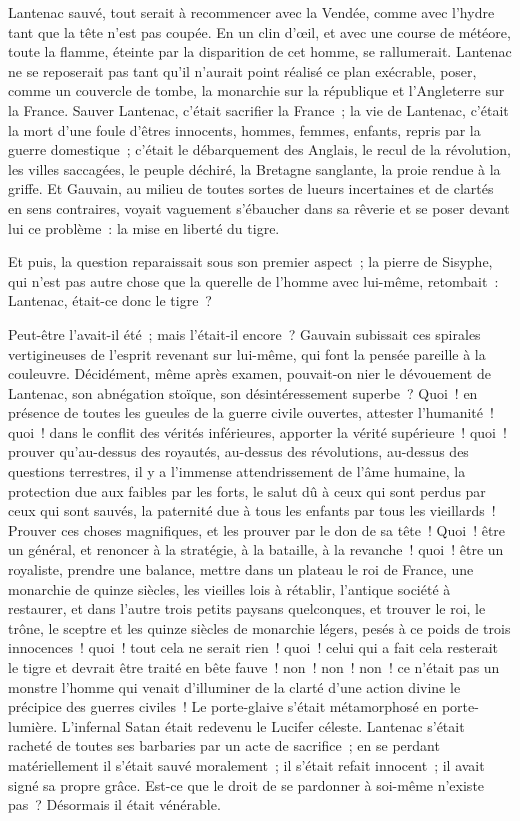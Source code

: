 \documentclass[french,twoside]{book} %
\begin{document}
Lantenac sauvé, tout serait à recommencer avec la Vendée, comme avec l’hydre tant que la tête n’est pas coupée. En un clin d’œil, et avec une course de météore, toute la flamme, éteinte par la disparition de cet homme, se rallumerait. Lantenac ne se reposerait pas tant qu’il n’aurait point réalisé ce plan exécrable, poser, comme un couvercle de tombe, la monarchie sur la république et l’Angleterre sur la France. Sauver Lantenac, c’était sacrifier la France ; la vie de Lantenac, c’était la mort d’une foule d’êtres innocents, hommes, femmes, enfants, repris par la guerre domestique ; c’était le débarquement des Anglais, le recul de la révolution, les villes saccagées, le peuple déchiré, la Bretagne sanglante, la proie rendue à la griffe. Et  Gauvain, au milieu de toutes sortes de lueurs incertaines et de clartés en sens contraires, voyait vaguement s’ébaucher dans sa rêverie et se poser devant lui ce problème : la mise en liberté du tigre.\par
Et puis, la question reparaissait sous son premier aspect ; la pierre de Sisyphe, qui n’est pas autre chose que la querelle de l’homme avec lui-même, retombait : Lantenac, était-ce donc le tigre ?\par
Peut-être l’avait-il été ; mais l’était-il encore ? Gauvain subissait ces spirales vertigineuses de l’esprit revenant sur lui-même, qui font la pensée pareille à la couleuvre. Décidément, même après examen, pouvait-on nier le dévouement de Lantenac, son abnégation stoïque, son désintéressement superbe ? Quoi ! en présence de toutes les gueules de la guerre civile ouvertes, attester l’humanité ! quoi ! dans le conflit des vérités inférieures, apporter la vérité supérieure ! quoi ! prouver qu’au-dessus des royautés, au-dessus des révolutions, au-dessus des questions terrestres, il y a l’immense attendrissement de l’âme humaine, la protection due aux faibles par les forts, le salut dû à ceux qui sont perdus par ceux qui sont sauvés, la paternité due à tous les enfants par tous les vieillards ! Prouver ces choses magnifiques, et les prouver par le don de sa tête ! Quoi ! être un général, et renoncer à la stratégie, à la bataille, à la revanche ! quoi ! être un royaliste, prendre une balance, mettre dans un plateau le roi de France, une monarchie de quinze siècles, les vieilles lois à rétablir, l’antique société à restaurer, et dans l’autre trois petits paysans quelconques,  et trouver le roi, le trône, le sceptre et les quinze siècles de monarchie légers, pesés à ce poids de trois innocences ! quoi ! tout cela ne serait rien ! quoi ! celui qui a fait cela resterait le tigre et devrait être traité en bête fauve ! non ! non ! non ! ce n’était pas un monstre l’homme qui venait d’illuminer de la clarté d’une action divine le précipice des guerres civiles ! Le porte-glaive s’était métamorphosé en porte-lumière. L’infernal Satan était redevenu le Lucifer céleste. Lantenac s’était racheté de toutes ses barbaries par un acte de sacrifice ; en se perdant matériellement il s’était sauvé moralement ; il s’était refait innocent ; il avait signé sa propre grâce. Est-ce que le droit de se pardonner à soi-même n’existe pas ? Désormais il était vénérable.\par
\end{document}
